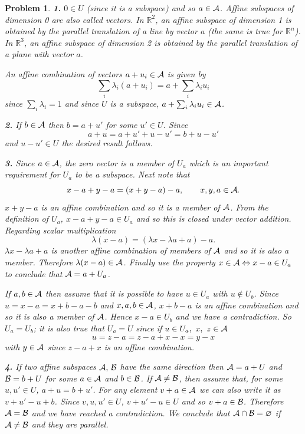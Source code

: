 \documentclass{article}
\newcommand{\subno}[1]{\par\noindent\textbf{#1}}
\newcommand{\R}{\mathbb{R}}
\theoremstyle{pprop}
\newtheorem{problem}{Problem}[section]
\begin{document}
\begin{problem}
\subno{1.} $0 \in U$ (since it is a subspace) and so $a \in \cal A$. Affine subspaces of dimension 0 are also called 
vectors. In $\R^2$, an affine subspace of dimension 1 is obtained by the parallel translation of a line by vector $a$ (the same is true 
for $\R^n$). In $\R^3$, an affine subspace of dimension 2 is obtained by the parallel translation of a plane with vector $a$. 

An affine combination of vectors $a+u_i \in \cal A$ is given by 
\[
\sum_i \lambda_i (a+u_i) = a + \sum_i \lambda_i u_i
\]
since $\sum_i \lambda_i =1$
and since $U$ is a subspace, $a+ \sum_i \lambda_i u_i \in \cal A$.
\subno{2.} If $b \in \cal A$ then $b=a+u'$ for some $u' \in U$. Since 
\[ 
a + u = a + u' + u - u' = b + u-u'
\]
and $u-u' \in U$ the desired result follows.
\subno{3.} Since $a \in \cal A$, the zero vector is a member of $U_a$ which is an important requirement for 
$U_a$ to be a subspace. Next note that 
\[
x - a +  y - a = (x + y - a) - a, \qquad x,y,a \in \cal A.
\]
$x+y-a$ is an affine combination and so it is a member of $\cal A$. From the definition of $U_a$,  
$x - a +  y - a \in U_a$ and so this is closed under vector addition. Regarding scalar multiplication 
\[
\lambda (x-a) = (\lambda x - \lambda a + a) - a.
\]
$\lambda x - \lambda a + a$ is another affine combination of members of $\cal A$ and so it is also a member. 
Therefore $\lambda (x-a) \in \cal A$. Finally use the property $x \in {\cal A} \Leftrightarrow x-a \in U_a$
to conclude that ${\cal A}=a + U_a$.

If $a,b \in \cal A$ then assume that it is possible to have $u \in U_a$ with $u \not\in U_b$. Since 
$u=x-a=x+b-a-b$ and $x,a,b \in \cal A$, $x+b-a$ is an affine combination and so it is also a member of 
$\cal A$. Hence $x-a \in U_b$ and we have a contradiction. So $U_a=U_b$; it is also true that $U_a=U$ since 
if $u \in U_a, \ x, \ z \in \cal A$ 
\[
u = z - a = z - a + x - x = y - x
\]
with $y \in \cal A$ since $z-a+x$ is an affine combination. 
\subno{4.} If two affine subspaces $\cal A,\, \cal B$ have the same direction then 
${\cal A}=a + U$ and ${\cal B}= b + U$ for some $a \in \cal A$ and $b \in \cal B$.  
If ${\cal A} \neq {\cal B}$, then assume that, for some $u,u' \in U$, $a+u=b+u'$. For any element 
$v + a \in \cal A$ we can also write it as $v + u' - u + b$. Since $v,u,u' \in U$, $v+u'-u \in U$ and so 
$v + a \in \cal B$. Therefore ${\cal A}={\cal B}$ and we have reached a contradiction. We conclude that 
${\cal A} \cap {\cal B} = \varnothing$ if ${\cal A} \neq {\cal B}$ and they are parallel.
\end{problem}
\end{document}
